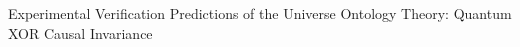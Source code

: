 Experimental Verification Predictions of the Universe Ontology Theory: Quantum XOR Causal Invariance